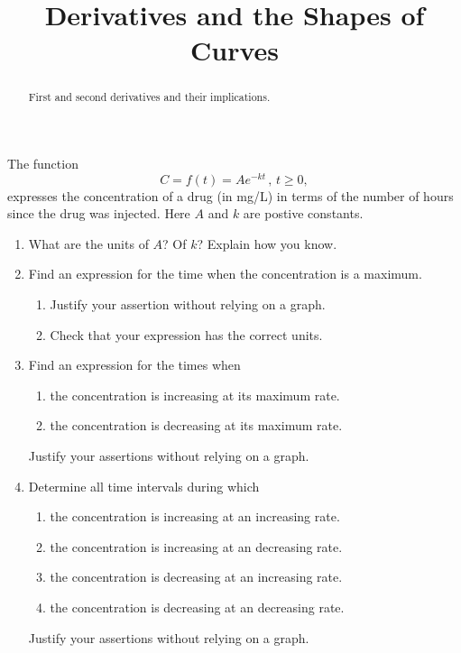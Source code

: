 \documentclass{ximera}
\title{Derivatives and the Shapes of Curves}
\begin{document}
\begin{abstract}
First and second derivatives and their implications.
\end{abstract}
\maketitle


\begin{question}  \label{Q56hnnhfgh}
The function
\[
      C = f(t) = A e^{-kt} \, , \, t\geq 0 ,
\]
expresses the concentration of a drug (in mg/L) in terms of the number of hours since the drug was injected. Here $A$ and $k$ are postive constants.

\begin{enumerate}
\item What are the units of $A$? Of $k$? Explain how you know.



\item Find an expression for the time when the concentration is a maximum.

\begin{enumerate}
\item Justify your assertion without relying on a graph.

\item Check that your expression has the correct units.
\end{enumerate}

\item Find an expression for the times when
\begin{enumerate}
\item the concentration is increasing at its maximum rate.

\item the concentration is decreasing at its maximum rate.

\end{enumerate}
Justify your assertions without relying on a graph.


\item Determine all time intervals during which 

\begin{enumerate}
\item the concentration is increasing at an increasing rate.

\item the concentration is increasing at an decreasing rate.

\item the concentration is decreasing at an increasing rate.

\item the concentration is decreasing at an decreasing rate.

\end{enumerate}
Justify your assertions without relying on a graph.




\end{enumerate}


\end{question}
\end{document}
